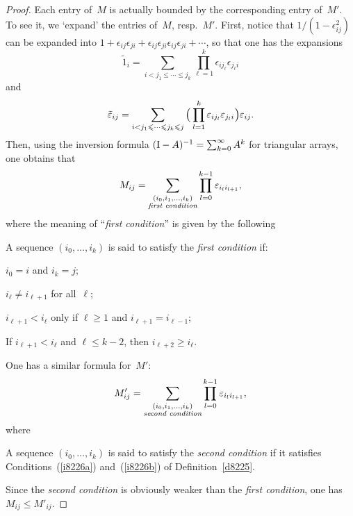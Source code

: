 \begin{proof}
Each entry of~$M$ is actually bounded by the corresponding entry of~$M'$.
To see it, we `expand' the entries of~$M$, resp.~$M'$.
First, notice that $1/(1-\epsilon_{ij}^2)$ can be expanded
into $1+\epsilon_{ij}\epsilon_{ji}
+ \epsilon_{ij}\epsilon_{ji}\epsilon_{ij}\epsilon_{ji} + \cdots$,
so that one has the expansions
\[ \tilde1_i = \sum_{i<j_1\leq\cdots\leq j_k} \prod_{\ell=1}^k
\epsilon_{ij_\ell} \epsilon_{j_\ell i} \]
and
\[ \teps_{ij} = \sum_{i<j_1\leq\cdots\leq j_k\leq j} \Big( \prod_{\ell=1}^k
\epsilon_{ij_\ell} \epsilon_{j_\ell i} \Big) \epsilon_{ij} .\]
Then, using the inversion formula $(\mrm{I}-A)^{-1} = \sum_{k=0}^\infty A^k$
for triangular arrays, one obtains that
\[ M_{ij} = \sum_{\substack{(i_0,i_1,\ldots,i_k)\\\text{\it first condition}}}
\prod_{\ell=0}^{k-1} \epsilon_{i_\ell i_{\ell+1}} ,\]
where the meaning of ``\textit{first condition}'' is given by the following
%
\begin{Def}\label{d8225}
A sequence $(i_0,\ldots,i_k)$ is said to satisfy the \textit{first condition} if:
\begin{ienumerate}
\item\label{i8226a} $i_0 = i$ and $i_k = j$;
\item\label{i8226b} $i_\ell \neq i_{\ell+1}$ for all~$\ell$;
\item $i_{\ell+1} < i_\ell$ only if $\ell \geq 1$ and $i_{\ell+1} = i_{\ell-1}$;
\item If $i_{\ell+1} < i_\ell$ and $\ell \leq k-2$,
then $i_{\ell+2} \geq i_\ell$.
\end{ienumerate}
\end{Def}

One has a similar formula for~$M'$:
\[ M'_{ij} = \sum_{\substack{(i_0,i_1,\ldots,i_k)\\\text{\it second condition}}}
\prod_{\ell=0}^{k-1} \epsilon_{i_\ell i_{\ell+1}} ,\]
where
\begin{Def}
A sequence $(i_0,\ldots,i_k)$ is said to satisfy the \textit{second condition} if
it satisfies Conditions~(\ref{i8226a}) and~(\ref{i8226b}) of Definition~\ref{d8225}.
\end{Def}

Since the \textit{second condition} is obviously weaker than the \textit{first condition},
one has $M_{ij} \leq M'_{ij}$.\linebreak[1]\strut
\end{proof}

